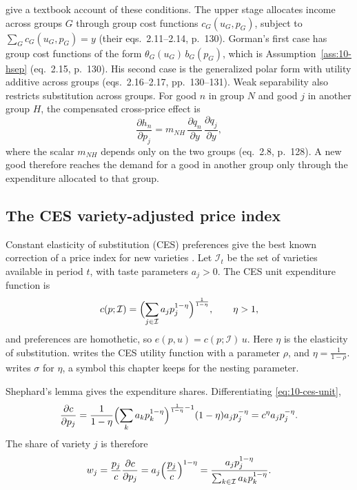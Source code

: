 \citet[Section~5.2, pp.~128--133]{DeatonMuellbauer1980b} give a textbook account of these conditions. The upper
stage allocates income across groups $G$ through group cost functions $c_G(u_G,p_G)$, subject to
$\sum_Gc_G(u_G,p_G) = y$ (their eqs.~2.11--2.14, p.~130). Gorman's first case has group cost functions of the form
$\theta_G(u_G)\,b_G(p_G)$, which is Assumption~\ref{ass:10-hsep} (eq.~2.15, p.~130). His second case is the generalized
polar form with utility additive across groups (eqs.~2.16--2.17, pp.~130--131). Weak separability also restricts substitution
across groups. For good $n$ in group $N$ and good $j$ in another group $H$, the compensated cross-price effect is
\begin{equation*}
  \frac{\partial h_n}{\partial p_j} = m_{NH}\,\frac{\partial q_n}{\partial y}\,\frac{\partial q_j}{\partial y},
\end{equation*}
where the scalar $m_{NH}$ depends only on the two groups (eq.~2.8, p.~128). A new good therefore reaches the
demand for a good in another group only through the expenditure allocated to that group.

\subsection{The CES variety-adjusted price index}\label{sec:10-feenstra}

Constant elasticity of substitution (CES) preferences give the best known correction of a price index for new
varieties \citep{Feenstra1994}. Let $\mathcal{I}_t$ be the set of varieties available in period $t$, with
taste parameters $a_j > 0$. The CES unit expenditure function is
\begin{equation}\label{eq:10-ces-unit}
  c(p;\mathcal{I}) = \Bigl(\sum_{j\in\mathcal{I}}a_jp_j^{1-\eta}\Bigr)^{\frac{1}{1-\eta}}, \qquad \eta > 1,
\end{equation}
and preferences are homothetic, so $e(p,u) = c(p;\mathcal{I})\,u$. Here $\eta$ is the elasticity of
substitution. \citet{Hausman1997} writes the CES utility function with a parameter $\rho$, and
$\eta = \frac{1}{1-\rho}$.  writes $\sigma$ for $\eta$, a symbol this chapter keeps for the
nesting parameter.

Shephard's lemma gives the expenditure shares. Differentiating \eqref{eq:10-ces-unit},
\begin{equation*}
  \frac{\partial c}{\partial p_j} = \frac{1}{1-\eta}\Bigl(\sum_k a_kp_k^{1-\eta}\Bigr)^{\frac{1}{1-\eta}-1}(1-\eta)a_jp_j^{-\eta}
  = c^{\eta}a_jp_j^{-\eta}.
\end{equation*}
The share of variety $j$ is therefore
\begin{equation}\label{eq:10-ces-share}
  w_j = \frac{p_j}{c}\frac{\partial c}{\partial p_j} = a_j\Bigl(\frac{p_j}{c}\Bigr)^{1-\eta}
  = \frac{a_jp_j^{1-\eta}}{\sum_{k\in\mathcal{I}}a_kp_k^{1-\eta}} .
\end{equation}

